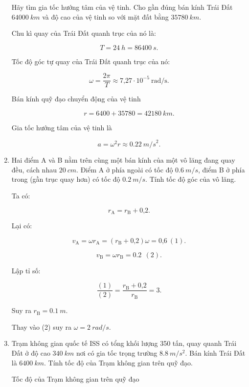 \begin{enumerate}[label=\bfseries Câu \arabic*:]
	
	{
		Hãy tìm gia tốc hướng tâm của vệ tinh. Cho gần đúng bán kính Trái Đất $\SI{64000}{km}$ và độ cao của vệ tinh so với mặt đất bằng $\SI{35780}{km}.$
	}
	
	\hideall
	{	
		Chu kì quay của Trái Đất quanh trục của nó là: 
		
		$$T = \SI{24}{h} = \SI{86400}{s}.$$
		
		Tốc độ góc tự quay của Trái Đất quanh trục của nó:
		
		$$\omega = \dfrac{2\pi}{T} \approx \text{7,27} \cdot 10^{-5}\ \text{rad/s}.$$
		
		Bán kính quỹ đạo chuyển động của vệ tinh
		
		$$r = 6400 + 35780 = \SI{42180}{km}.$$
		
		Gia tốc hướng tâm của vệ tinh là
		
		$$a = \omega^2 r \approx \SI{0,22}{m/s}^2.$$
		}
	\item {}
	
	
	{
		Hai điểm A và B nằm trên cùng một bán kính của một vô lăng đang quay đều, cách nhau $\SI{20}{cm}$. Điểm A ở phía ngoài có tốc độ $\SI{0,6}{m/s}$, điểm B ở phía trong (gần trục quay hơn) có tốc độ $\SI{0,2}{m/s}$. Tính tốc độ góc của vô lăng.
	}
	
	\hideall
	{	
		Ta có: 
		
		$$r_\text{A} = r_\text{B} + \text{0,2}.$$
		
		Lại có:
		
		$$v_\text{A} = \omega r_\text{A} = (r_\text{B} + \text{0,2}) \omega = \text{0,6}\ (1).$$
		
		$$v_\text{B} = \omega r_\text{B} = \SI{0,2}{}\ (2).$$
		
		Lập tỉ số:
		
		$$\dfrac{(1)}{(2)} = \dfrac{ r_\text{B} + \text{0,2}}{r_\text{B}} = 3.$$
		
		Suy ra $r_\text{B} = \SI{0,1}{m}.$
		
		Thay vào (2) suy ra $\omega = \SI{2}{rad/s}.$
	

	}
		\item {}
		
		
		{
			Trạm không gian quốc tế ISS có tổng khối lượng 350 tấn, quay quanh Trái Đất ở độ cao $\SI{340}{km}$ nơi có gia tốc trọng trường $\SI{8,8}{m/s^2}$. Bán kính Trái Đất là $\SI{6400}{km}$. Tính tốc độ của Trạm không gian trên quỹ đạo.
		}
		
		\hideall
		{	
		
			Tốc độ của Trạm không gian trên quỹ đạo
			
}
\end{enumerate}
